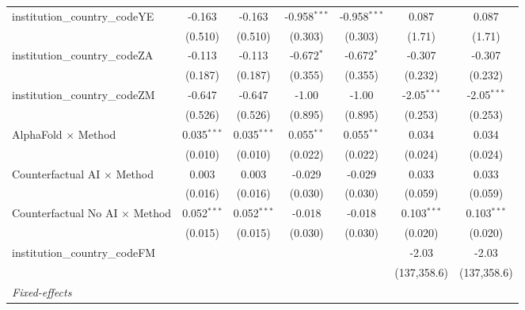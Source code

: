 \begin{tabular}{lcccccc}
   institution\_country\_codeYE          & -0.163         & -0.163         & -0.958$^{***}$ & -0.958$^{***}$ & 0.087          & 0.087\\   
                                         & (0.510)        & (0.510)        & (0.303)        & (0.303)        & (1.71)         & (1.71)\\   
   institution\_country\_codeZA          & -0.113         & -0.113         & -0.672$^{*}$   & -0.672$^{*}$   & -0.307         & -0.307\\   
                                         & (0.187)        & (0.187)        & (0.355)        & (0.355)        & (0.232)        & (0.232)\\   
   institution\_country\_codeZM          & -0.647         & -0.647         & -1.00          & -1.00          & -2.05$^{***}$  & -2.05$^{***}$\\   
                                         & (0.526)        & (0.526)        & (0.895)        & (0.895)        & (0.253)        & (0.253)\\   
   AlphaFold $\times$ Method             & 0.035$^{***}$  & 0.035$^{***}$  & 0.055$^{**}$   & 0.055$^{**}$   & 0.034          & 0.034\\   
                                         & (0.010)        & (0.010)        & (0.022)        & (0.022)        & (0.024)        & (0.024)\\   
   Counterfactual AI $\times$ Method     & 0.003          & 0.003          & -0.029         & -0.029         & 0.033          & 0.033\\   
                                         & (0.016)        & (0.016)        & (0.030)        & (0.030)        & (0.059)        & (0.059)\\   
   Counterfactual No AI $\times$ Method  & 0.052$^{***}$  & 0.052$^{***}$  & -0.018         & -0.018         & 0.103$^{***}$  & 0.103$^{***}$\\   
                                         & (0.015)        & (0.015)        & (0.030)        & (0.030)        & (0.020)        & (0.020)\\   
   institution\_country\_codeFM          &                &                &                &                & -2.03          & -2.03\\   
                                         &                &                &                &                & (137,358.6)    & (137,358.6)\\   
   \midrule
   \emph{Fixed-effects}\\

\end{tabular}
